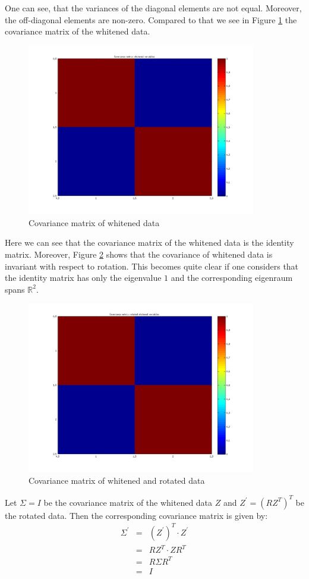 \documentclass{article}
\begin{document}
		One can see, that the variances of the diagonal elements are not equal. Moreover, the off-diagonal elements are non-zero. 
		Compared to that we see in Figure \ref{fig:task3CoW} the covariance matrix of the whitened data.
		
		\begin{figure}[H]
			\centering
			\includegraphics[width=10cm]{task3CovarianceWhitened.png}
			\caption{Covariance matrix of whitened data}
			\label{fig:task3CoW}
		\end{figure}
		
		Here we can see that the covariance matrix of the whitened data is the identity matrix. Moreover, Figure \ref{fig:task3CoWR} shows that the covariance of whitened data is invariant with respect to rotation. This becomes quite clear if one considers that the identity matrix has only the eigenvalue $1$ and the corresponding eigenraum spans $\mathbb{R}^2$.  
		
		\begin{figure}[H]
			\centering
			\includegraphics[width=10cm]{task3CovarianceRotated.png}
			\caption{Covariance matrix of whitened and rotated data}
			\label{fig:task3CoWR}
		\end{figure}
		
		Let $\Sigma=I$ be the covariance matrix of the whitened data $Z$ and $Z^{\prime}=(RZ^{T})^{T}$ be the rotated data. Then the corresponding covariance matrix is given by:
		\begin{eqnarray}
			\Sigma^{\prime} &=& (Z^{\prime})^{T}\cdot Z^{\prime}\\
			&=& RZ^{T}\cdot ZR^{T}\\
			&=& R\Sigma R^{T}\\
			&=& I
		\end{eqnarray}
		
\end{document}

